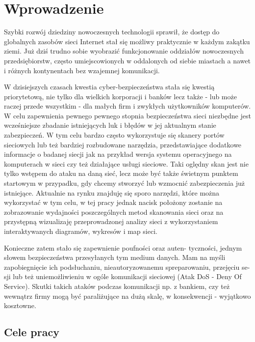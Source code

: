 \chapter{Wprowadzenie}
\label{cha:wprowadzenie}

Szybki rozwój dziedziny nowoczesnych technologii sprawił, że dostęp do
globalnych zasobów sieci Internet stał się możliwy praktycznie w każdym zakątku
ziemi. Już dziś trudno sobie wyobrazić funkcjonowanie oddziałów nowoczesnych
przedsiębiorstw, często umiejscowionych w oddalonych od siebie miastach a nawet i
różnych kontynentach bez wzajemnej komunikacji.

W dzisiejszych czasach kwestia cyber-bezpieczeństwa stała się kwestią priorytetową, nie tylko dla wielkich korporacji i banków lecz także - lub może raczej przede wszystkim - dla małych firm i zwykłych użytkowników komputerów. W celu zapewnienia pewnego pewnego stopnia bezpieczeństwa sieci niezbędne jest wcześniejsze zbadanie istniejących luk i błędów w jej aktualnym stanie zabezpieczeń. W tym celu bardzo często wykorzystuje się skanery portów sieciowych lub też bardziej rozbudowane narzędzia, przedstawiające dodatkowe informacje o badanej siecji jak na przykład wersja systemu operacyjnego na komputerach w sieci czy też działające usługi sieciowe. Taki oględny skan jest nie tylko wstępem do ataku na daną sieć, lecz może być także świetnym punktem startowym w przypadku, gdy chcemy stworzyć lub wzmocnić zabezpieczenia już istniejące. Aktualnie na rynku znajduję się sporo narzędzi, które można wykorzystać w tym celu, w tej pracy jednak nacisk położony zostanie na zobrazowanie wydajności poszczególnych metod skanowania sieci oraz na przystępną wizualizaję przeprowadzonej analizy sieci z wykorzystaniem interaktywanych diagramów, wykresów i map sieci.

Konieczne zatem stało się zapewnienie poufności oraz auten-
tyczności, jednym słowem bezpieczeństwa przesyłanych tym medium danych. Mam na
myśli zapobiegnięcie ich podsłuchaniu, nieautoryzowanemu spreparowaniu, przejęciu se-
sji lub też uniemożliwieniu w ogóle komunikacji sieciowej (Atak DoS - Deny Of Service).
Skutki takich ataków podczas komunikacji np. z bankiem, czy też wewnątrz firmy mogą
być paraliżujące na dużą skalę, w konsekwencji - wyjątkowo kosztowne.


\section{Cele pracy}
\label{sec:celePracy}

